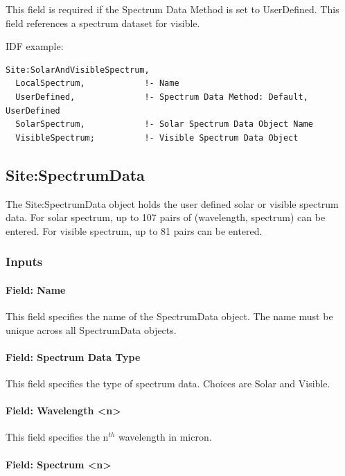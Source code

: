 This field is required if the Spectrum Data Method is set to UserDefined. This field references a spectrum dataset for visible.

IDF example:

\begin{lstlisting}
Site:SolarAndVisibleSpectrum,
  LocalSpectrum,            !- Name
  UserDefined,              !- Spectrum Data Method: Default, UserDefined
  SolarSpectrum,            !- Solar Spectrum Data Object Name
  VisibleSpectrum;          !- Visible Spectrum Data Object
\end{lstlisting}

\subsection{Site:SpectrumData}\label{sitespectrumdata}

The Site:SpectrumData object holds the user defined solar or visible spectrum data. For solar spectrum, up to 107 pairs of (wavelength, spectrum) can be entered. For visible spectrum, up to 81 pairs can be entered.

\subsubsection{Inputs}\label{inputs-25-001}

\paragraph{Field: Name}\label{field-name-11-007}

This field specifies the name of the SpectrumData object. The name must be unique across all SpectrumData objects.

\paragraph{Field: Spectrum Data Type}\label{field-spectrum-data-type}

This field specifies the type of spectrum data. Choices are Solar and Visible.

\paragraph{Field: Wavelength \textless{}n\textgreater{}}\label{field-wavelength-n}

This field specifies the n$^{th}$ wavelength in micron.

\paragraph{Field: Spectrum \textless{}n\textgreater{}}\label{field-spectrum-n}

